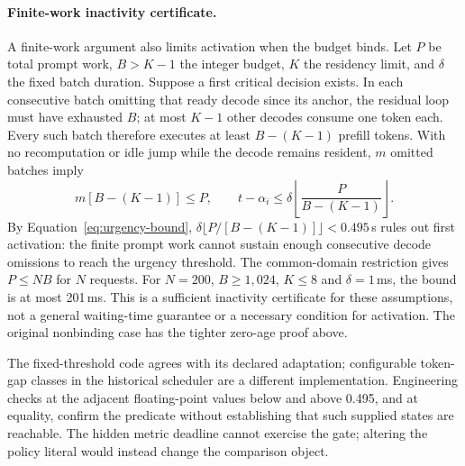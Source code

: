 \paragraph{Finite-work inactivity certificate.}
A finite-work argument also limits activation when the budget binds. Let
$P$ be total prompt work, $B>K-1$ the integer budget, $K$ the residency
limit, and $\delta$ the fixed batch duration. Suppose a first critical
decision exists. In each consecutive batch omitting that ready decode
since its anchor, the residual loop must have exhausted $B$; at most
$K-1$ other decodes consume one token each. Every such batch therefore
executes at least $B-(K-1)$ prefill tokens. With no recomputation or idle
jump while the decode remains resident, $m$ omitted batches imply
\begin{equation}\label{eq:urgency-bound}
 m[B-(K-1)]\leq P,\qquad
 t-\alpha_i\leq\delta\left\lfloor\frac{P}{B-(K-1)}\right\rfloor.
\end{equation}
By Equation~\ref{eq:urgency-bound}, $\delta\lfloor P/[B-(K-1)]\rfloor<0.495$\,s rules out first activation:
the finite prompt work cannot sustain enough consecutive decode omissions
to reach the urgency threshold.
The common-domain restriction gives $P\leq NB$ for $N$ requests. For
$N=200$, $B\geq1,024$, $K\leq8$ and $\delta=1$\,ms, the bound is at most
201\,ms. This is a sufficient inactivity certificate for these assumptions,
not a general waiting-time guarantee or a necessary condition for activation.
The original nonbinding case has the tighter zero-age proof above.

The fixed-threshold code agrees with its declared adaptation; configurable
token-gap classes in the historical scheduler are a different implementation.
Engineering checks at the adjacent floating-point values below and above
0.495, and at equality, confirm the predicate without establishing that
such supplied states are reachable. The hidden metric deadline cannot exercise the gate; altering the policy
literal would instead change the comparison object.

